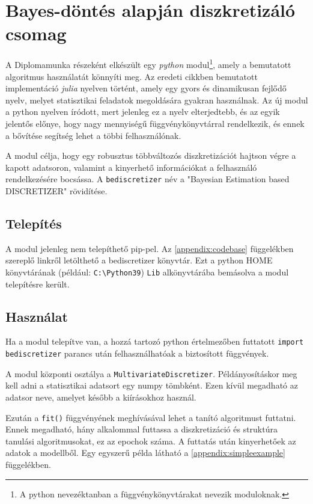 \chapter{Bayes-döntés alapján diszkretizáló csomag}\label{chapter:modul}

\iffalse
A Diplomamunka részeként elkészült egy \textit{python} modul\footnote{A python nevezéktanban a függvénykönyvtárakat nevezik moduloknak.}, amely a bemutatott algoritmus használatát könnyíti meg. Az eredeti cikkben bemutatott implementáció \textit{julia} nyelven történt, amely egy gyors és dinamikusan fejlődő nyelv, melyet statisztikai feladatok megoldására gyakran használnak. Az új modul a python nyelven íródott, mert jelenleg ez a nyelv elterjedtebb, és az egyik jelentős előnye, hogy nagy mennyiségű függvénykönyvtárral rendelkezik, és ennek a bővítése segítség lehet a többi felhasználónak.

A modul célja, hogy egy robusztus többváltozós diszkretizációt hajtson végre a kapott adatsoron, valamint a kinyerhető információkat a felhasználó rendelkezésére bocsássa. A \verb|bediscretizer| név a "Bayesian Estimation based DISCRETIZER" rövidítése.

\section{Telepítés}
A modul jelenleg nem telepíthető pip-pel. Az \ref{appendix:codebase} függelékben szereplő linkről letölthető a bediscretizer könyvtár. Ezt a python HOME könyvtárának (például: \verb|C:\Python39|) \verb|Lib| alkönyvtárába bemásolva a modul telepítésre került.

\section{Használat}
Ha a modul telepítve van, a hozzá tartozó python értelmezőben futtatott \verb|import bediscretizer| parancs után felhasználhatóak a biztosított függvények.

A modul központi osztálya a \verb|MultivariateDiscretizer|. Példányosításkor meg kell adni a statisztikai adatsort egy numpy tömbként. Ezen kívül megadható az adatsor neve, amelyet később a kiírásokhoz használ.

Ezután a \verb|fit()| függvényének meghívásával lehet a tanító algoritmust futtatni. Ennek megadható, hány alkalommal futtassa a diszkretizáció és struktúra tanulási algoritmusokat, ez az epochok száma.
A futtatás után kinyerhetőek az adatok a modellből. Egy egyszerű példa látható a \ref{appendix:simpleexample} függelékben.

